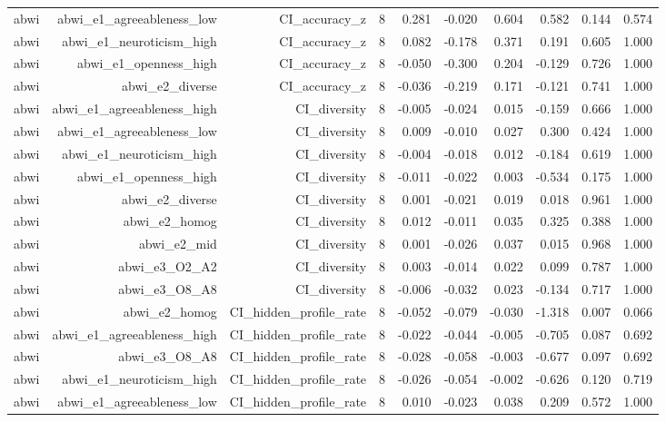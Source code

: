 \documentclass[11pt]{article}
\begin{document}
\begin{landscape}
\begin{longtable}{@{}lrrrrrrrrr@{}}
abwi & abwi\_e1\_agreeableness\_low & CI\_accuracy\_z & 8 & 0.281 & -0.020 & 0.604 & 0.582 & 0.144 & 0.574 \\
abwi & abwi\_e1\_neuroticism\_high & CI\_accuracy\_z & 8 & 0.082 & -0.178 & 0.371 & 0.191 & 0.605 & 1.000 \\
abwi & abwi\_e1\_openness\_high & CI\_accuracy\_z & 8 & -0.050 & -0.300 & 0.204 & -0.129 & 0.726 & 1.000 \\
abwi & abwi\_e2\_diverse & CI\_accuracy\_z & 8 & -0.036 & -0.219 & 0.171 & -0.121 & 0.741 & 1.000 \\
abwi & abwi\_e1\_agreeableness\_high & CI\_diversity & 8 & -0.005 & -0.024 & 0.015 & -0.159 & 0.666 & 1.000 \\
abwi & abwi\_e1\_agreeableness\_low & CI\_diversity & 8 & 0.009 & -0.010 & 0.027 & 0.300 & 0.424 & 1.000 \\
abwi & abwi\_e1\_neuroticism\_high & CI\_diversity & 8 & -0.004 & -0.018 & 0.012 & -0.184 & 0.619 & 1.000 \\
abwi & abwi\_e1\_openness\_high & CI\_diversity & 8 & -0.011 & -0.022 & 0.003 & -0.534 & 0.175 & 1.000 \\
abwi & abwi\_e2\_diverse & CI\_diversity & 8 & 0.001 & -0.021 & 0.019 & 0.018 & 0.961 & 1.000 \\
abwi & abwi\_e2\_homog & CI\_diversity & 8 & 0.012 & -0.011 & 0.035 & 0.325 & 0.388 & 1.000 \\
abwi & abwi\_e2\_mid & CI\_diversity & 8 & 0.001 & -0.026 & 0.037 & 0.015 & 0.968 & 1.000 \\
abwi & abwi\_e3\_O2\_A2 & CI\_diversity & 8 & 0.003 & -0.014 & 0.022 & 0.099 & 0.787 & 1.000 \\
abwi & abwi\_e3\_O8\_A8 & CI\_diversity & 8 & -0.006 & -0.032 & 0.023 & -0.134 & 0.717 & 1.000 \\
abwi & abwi\_e2\_homog & CI\_hidden\_profile\_rate & 8 & -0.052 & -0.079 & -0.030 & -1.318 & 0.007 & 0.066 \\
abwi & abwi\_e1\_agreeableness\_high & CI\_hidden\_profile\_rate & 8 & -0.022 & -0.044 & -0.005 & -0.705 & 0.087 & 0.692 \\
abwi & abwi\_e3\_O8\_A8 & CI\_hidden\_profile\_rate & 8 & -0.028 & -0.058 & -0.003 & -0.677 & 0.097 & 0.692 \\
abwi & abwi\_e1\_neuroticism\_high & CI\_hidden\_profile\_rate & 8 & -0.026 & -0.054 & -0.002 & -0.626 & 0.120 & 0.719 \\
abwi & abwi\_e1\_agreeableness\_low & CI\_hidden\_profile\_rate & 8 & 0.010 & -0.023 & 0.038 & 0.209 & 0.572 & 1.000 \\

\end{longtable}
\end{landscape}
\end{document}
